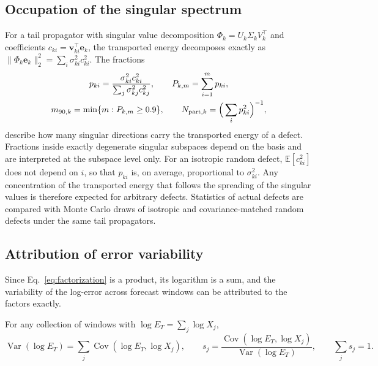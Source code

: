 \subsection{Occupation of the singular spectrum}

For a tail propagator with singular value decomposition $\Phi_k=U_k\Sigma_kV_k^\top$ and coefficients $c_{ki}=\mathbf v_{ki}^\top\mathbf e_k$, the transported energy decomposes exactly as $\|\Phi_k\mathbf e_k\|_2^2=\sum_i\sigma_{ki}^2c_{ki}^2$. The fractions
\begin{equation}
  \begin{gathered}
  p_{ki}=\frac{\sigma_{ki}^2c_{ki}^2}{\sum_j\sigma_{kj}^2c_{kj}^2},
  \qquad
  P_{k,m}=\sum_{i=1}^{m}p_{ki},
  \\
  m_{90,k}=\min\{m:P_{k,m}\ge0.9\},
  \qquad
  N_{{\rm part},k}=\Big(\sum_ip_{ki}^2\Big)^{-1},
  \end{gathered}
  \label{eq:spectral}
\end{equation}
describe how many singular directions carry the transported energy of a defect. Fractions inside exactly degenerate singular subspaces depend on the basis and are interpreted at the subspace level only. For an isotropic random defect, $\mathbb E[c_{ki}^2]$ does not depend on $i$, so that $p_{ki}$ is, on average, proportional to $\sigma_{ki}^2$. Any concentration of the transported energy that follows the spreading of the singular values is therefore expected for arbitrary defects. Statistics of actual defects are compared with Monte Carlo draws of isotropic and covariance-matched random defects under the same tail propagators.

\subsection{Attribution of error variability}

Since Eq.~\eqref{eq:factorization} is a product, its logarithm is a sum, and the variability of the log-error across forecast windows can be attributed to the factors exactly.

\begin{proposition}
\label{prop:attribution}
For any collection of windows with $\log E_T=\sum_j\log X_j$,
\begin{equation}
  \operatorname{Var}(\log E_T)=\sum_j\operatorname{Cov}(\log E_T,\log X_j),
  \qquad
  s_j=\frac{\operatorname{Cov}(\log E_T,\log X_j)}{\operatorname{Var}(\log E_T)},
  \qquad
  \sum_js_j=1.
  \label{eq:shares}
\end{equation}
\end{proposition}

